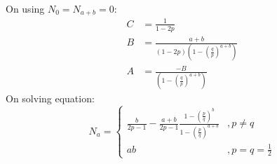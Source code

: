 \documentclass{beamer}
\providecommand{\brak}[1]{\ensuremath{\left(#1\right)}}
\begin{document}
\begin{frame}
On using $N_{0}=N_{a+b}=0$:
\begin{align}
C&=\frac{1}{1-2p}\\
B&=\frac{a+b}{\brak{1-2p}\brak{1-\brak{\frac{q}{p}}^{a+b}}}\\
A&=\frac{-B}{\brak{1-\brak{\frac{q}{p}}^{a+b}}}
\end{align}
On solving equation:
\begin{equation}
N_a =
\begin{cases}
\frac{b}{2p-1}-\frac{a+b}{2p-1}\frac{1-\brak{\frac{p}{q}}^{b}}{1-\brak{\frac{p}{q}}^{a+b}} & ,p \neq q \\
ab  &,p=q=\frac{1}{2}
\end{cases}
\end{equation}
\end{frame}
\end{document}
